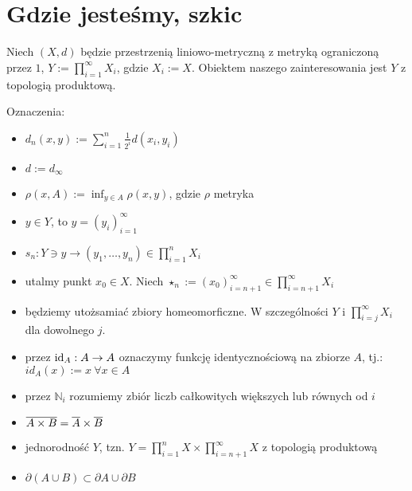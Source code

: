 \section{Gdzie jesteśmy, szkic}
Niech $(X, d)$ będzie przestrzenią liniowo-metryczną z metryką ograniczoną przez $1$, $Y := \prod_{i=1}^{\infty} X_i$, gdzie $X_i := X$. Obiektem naszego zainteresowania jest $Y$ z topologią produktową.

Oznaczenia:
\begin{itemize}
  \item $d_n(x, y) := \sum_{i=1}^n \frac{1}{2^i} d(x_i, y_i)$
  \item $d := d_\infty$
  \item $\rho(x, A) := \inf_{y \in A} \rho(x, y)$, gdzie $\rho$ metryka
  \item $y \in Y$, to $y = (y_i)_{i=1}^\infty$
  \item $s_n: Y \ni y \rightarrow (y_1, \ldots, y_n) \in \prod_{i=1}^{n} X_i$
  \item utalmy punkt $x_0 \in X$. Niech $\star_n := (x_0)_{i=n+1}^\infty \in \prod_{i=n+1}^\infty X_i$
  \item będziemy utożsamiać zbiory homeomorficzne. W szczególności $Y$ i $\prod_{i=j}^\infty X_i$ dla dowolnego $j$.
  \item przez $\mbox{id}_A: A \rightarrow A$ oznaczymy funkcję identycznościową na zbiorze $A$, tj.: $id_A(x) := x\ \forall x \in A$
  \item przez $\mathbb{N}_i$  rozumiemy zbiór liczb całkowitych większych lub równych od $i$
\end{itemize}

\begin{note} \mbox{} %
\begin{itemize}
  \item $\overline{A \times B} = \overline{A} \times \overline{B}$
  \item jednorodność $Y$, tzn. $Y = \prod_{i=1}^n X \times \prod_{i=n+1}^\infty X$ z topologią produktową
  \item $\partial(A \cup B) \subset \partial A \cup \partial B$
\end{itemize}
\end{note}